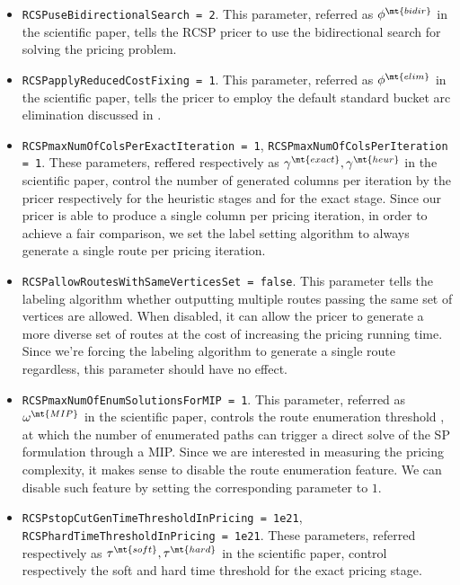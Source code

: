 \begin{itemize}
	\item \texttt{RCSPuseBidirectionalSearch = 2}.
	      This parameter, referred as $\phi^\mt{bidir}$ in the scientific paper,
	      tells the RCSP pricer to use the bidirectional search for solving the pricing problem.
	\item \texttt{RCSPapplyReducedCostFixing = 1}.
	      This parameter, referred as $\phi^\mt{elim}$ in the scientific paper,
	      tells the pricer to employ the default standard bucket arc elimination discussed in \textcite{sadykov2021bucket}.
	\item \texttt{RCSPmaxNumOfColsPerExactIteration = 1}, \texttt{RCSPmaxNumOfColsPerIteration = 1}.
	      These parameters, reffered respectively as $\gamma^\mt{exact}, \gamma^\mt{heur}$ in the scientific paper,
	      control the number of generated columns per iteration by the pricer respectively
	      for the heuristic stages
	      and for the exact stage.
	      Since our pricer is able to produce a single column per pricing iteration, in order to achieve a fair comparison,
	      we set the label setting algorithm to always generate a single route per pricing iteration.
	\item \texttt{RCSPallowRoutesWithSameVerticesSet = false}.
	      This parameter tells the labeling algorithm whether outputting multiple routes passing the same set of vertices are allowed.
	      When disabled,
	      it can allow the pricer to generate a more diverse set of routes
	      at the cost of increasing the pricing running time.
	      Since we're forcing the labeling algorithm to generate a single route regardless, this parameter should have no effect.
	\item \texttt{RCSPmaxNumOfEnumSolutionsForMIP = 1}.
	      This parameter, referred as $\omega^\mt{MIP}$ in the scientific paper,
	      controls the route enumeration threshold \parencite{baldacci2008},
	      at which the number of enumerated paths can trigger a direct solve of the SP formulation through a MIP.
	      Since we are interested in measuring the pricing complexity, it makes sense to disable the route enumeration feature.
	      We can disable such feature by setting the corresponding parameter to $1$.
	\item \texttt{RCSPstopCutGenTimeThresholdInPricing = 1e21}, \texttt{RCSPhardTimeThresholdInPricing = 1e21}.
	      These parameters, referred respectively as $\tau^\mt{soft}, \tau^\mt{hard}$ in the scientific paper,
	      control respectively the soft and hard time threshold for the exact pricing stage.

\end{itemize}
